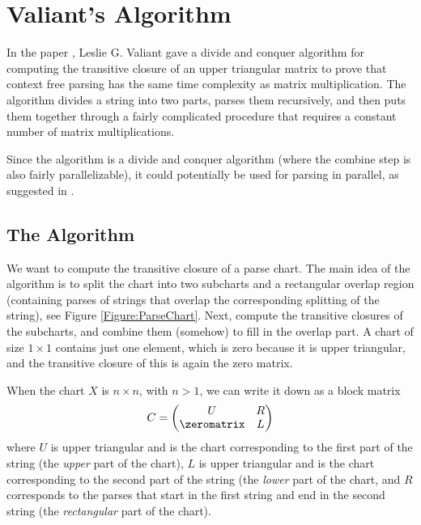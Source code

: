 \section{Valiant's Algorithm}
\label{Section:Valiant}
\label{Valiant}
In the paper \cite{Valiant}, Leslie G. Valiant gave a divide and conquer algorithm for computing the transitive closure of an upper triangular matrix to prove that context free parsing has the same time complexity as matrix multiplication. The algorithm divides a string into two parts, parses them recursively, and then puts them together through a fairly complicated procedure that requires a constant number of matrix multiplications.

Since the algorithm is a divide and conquer algorithm (where the combine step is also fairly parallelizable), it could potentially be used for parsing in parallel, as suggested in \cite{JP-PP}.

\subsection{The Algorithm}
We want to compute the transitive closure of a parse chart. The main idea of the algorithm is to split the chart into two subcharts and a rectangular overlap region (containing parses of strings that overlap the corresponding splitting of the string), see Figure \ref{Figure:ParseChart}. Next, compute the transitive closures of the subcharts, and combine them (somehow) to fill in the overlap part. A chart of size $1 \times 1$ contains just one element, which is zero because it is upper triangular, and the transitive closure of this is again the zero matrix.

\label{Section:Subdivision-in-Specification}
When the chart $X$ is $n \times n$, with $n > 1$, we can write it down as a block matrix 
\begin{equation*}
  C = 
  \begin{pmatrix}
    U & R \\
    \zeromatrix & L
  \end{pmatrix}
\end{equation*}
where $U$ is upper triangular and is the chart corresponding to the first part of the string (the \emph{upper} part of the chart), $L$ is upper triangular and is the chart corresponding to the second part of the string (the \emph{lower} part of the chart, and $R$ corresponds to the parses that start in the first string and end in the second string (the \emph{rectangular} part of the chart).

